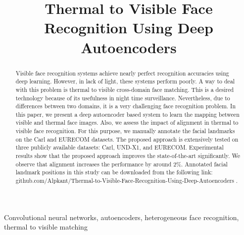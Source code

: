 \documentclass[conference]{IEEEtran}
\begin{document}
\title{Thermal to Visible Face Recognition Using Deep Autoencoders}
\renewcommand{\refname}{References}
\author{
\and
{}
}

\maketitle

\begin{abstract}
Visible face recognition systems achieve nearly perfect recognition accuracies using deep learning. 
However, in lack of light, these systems perform poorly. A way to deal with this problem is thermal to visible cross-domain face matching. This is a desired technology because of its usefulness in night time surveillance. Nevertheless, due to differences between two domains, it is a very challenging face recognition problem. In this paper, we present a deep autoencoder based system to learn the mapping between visible and thermal face images. 
Also, we assess the impact of alignment in thermal to visible face recognition. For this purpose, we manually annotate the facial landmarks on the Carl and EURECOM datasets. The proposed approach is extensively tested on three publicly available datasets: Carl, UND-X1, and EURECOM. Experimental results show that the proposed approach improves the state-of-the-art significantly. We observe that alignment increases the performance by around 2\%. Annotated facial landmark positions in this study can be downloaded from the following link: github.com/Alpkant/Thermal-to-Visible-Face-Recognition-Using-Deep-Autoencoders .
\end{abstract}

\begin{IEEEkeywords}
Convolutional neural networks, autoencoders, heterogeneous face recognition, thermal to visible matching
\end{IEEEkeywords}
\end{document}

